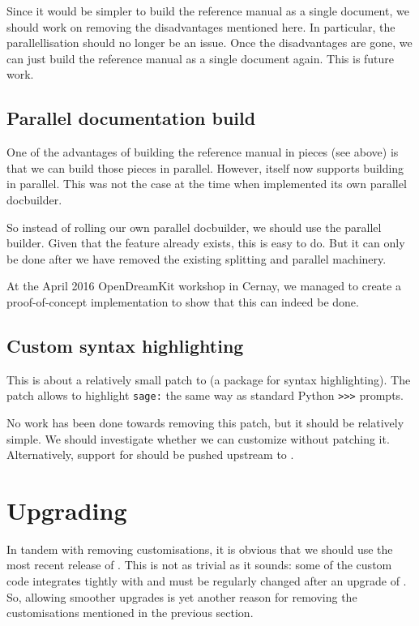 \documentclass{deliverablereport}
\begin{document}
Since it would be simpler to build the reference manual as a single document,
we should work on removing the disadvantages mentioned here.
In particular, the parallellisation should no longer be an issue.
Once the disadvantages are gone, we can just build the reference manual
as a single document again.
This is future work.

\subsection{Parallel documentation build}

One of the advantages of building the reference manual in pieces
(see above) is that we can build those pieces in parallel.
However, \Sphinx itself now supports building in parallel.
This was not the case at the time when \Sage
implemented its own parallel docbuilder.

So instead of rolling our own parallel docbuilder,
we should use the \Sphinx parallel builder.
Given that the feature already exists, this is easy to do.
But it can only be done after we have removed the existing
splitting and parallel machinery.

At the April 2016 OpenDreamKit workshop in Cernay,
we managed to create a proof-of-concept implementation
to show that this can indeed be done.

\subsection{Custom syntax highlighting}

This is about a relatively small patch to \Pygments
(a package for syntax highlighting).
The patch allows to highlight \texttt{sage:} the same way
as standard Python \texttt{>>>} prompts.

No work has been done towards removing this patch,
but it should be relatively simple.
We should investigate whether we can customize \Pygments without
patching it.
Alternatively, support for \Sage should be pushed upstream to \Pygments.

\section{Upgrading \Sphinx}

In tandem with removing customisations, it is obvious that we
should use the most recent release of \Sphinx.
This is not as trivial as it sounds:
some of the custom code integrates tightly with \Sphinx
and must be regularly changed after an upgrade of \Sphinx.
So, allowing smoother upgrades is yet another reason for
removing the customisations mentioned in the previous section.
\end{document}
